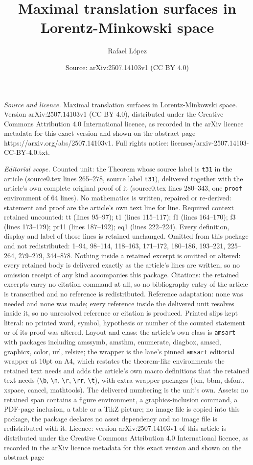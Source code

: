\documentclass[10pt,a4paper]{amsart}
\title[Maximal translation surfaces in Lorentz-Minkowski space]{Maximal translation surfaces in Lorentz-Minkowski space}
\author{Rafael L\'opez}
\date{Source: arXiv:2507.14103v1 (CC BY 4.0)}
\begin{document}
\maketitle

\noindent\emph{Source and licence.} Maximal translation surfaces in Lorentz-Minkowski space. Version arXiv:2507.14103v1 (CC BY 4.0), distributed under the Creative Commons Attribution 4.0 International licence, as recorded in the arXiv licence metadata for this exact version and shown on the abstract page https://arxiv.org/abs/2507.14103v1. Full rights notice: licenses/arxiv-2507.14103-CC-BY-4.0.txt.\par\smallskip

\noindent\textit{Editorial scope.} Counted unit: the Theorem whose source label is \texttt{t31} in the article (source0.tex lines 265--278, source label \texttt{t31}), delivered together with the article's own complete original proof of it (source0.tex lines 280--343, one \texttt{proof} environment of 64 lines). No mathematics is written, repaired or re-derived: statement and proof are the article's own text line for line. Required context retained uncounted: tt (lines 95--97); t1 (lines 115--117); f1 (lines 164--170); f3 (lines 173--179); pr11 (lines 187--192); eq1 (lines 222--224). Every definition, display and label of those lines is retained unchanged. Omitted from this package and not redistributed: 1--94, 98--114, 118--163, 171--172, 180--186, 193--221, 225--264, 279--279, 344--878. Nothing inside a retained excerpt is omitted or altered: every retained body is delivered exactly as the article's lines are written, so no omission receipt of any kind accompanies this package. Citations: the retained excerpts carry no citation command at all, so no bibliography entry of the article is transcribed and no reference is redistributed. Reference adaptation: none was needed and none was made; every reference inside the delivered unit resolves inside it, so no unresolved reference or citation is produced. Printed slips kept literal: no printed word, symbol, hypothesis or number of the counted statement or of its proof was altered. Layout and class: the article's own class is \texttt{amsart} with packages including amssymb, amsthm, enumerate, diagbox, amscd, graphicx, color, url, relsize; the wrapper is the lane's pinned \texttt{amsart} editorial wrapper at 10pt on A4, which restates the theorem-like environments the retained text needs and adds the article's own macro definitions that the retained text needs (\texttt{\textbackslash b}, \texttt{\textbackslash n}, \texttt{\textbackslash r}, \texttt{\textbackslash rr}, \texttt{\textbackslash t}), with extra wrapper packages (bm, bbm, dsfont, xspace, cancel, mathtools). The delivered numbering is the unit's own. Assets: no retained span contains a figure environment, a graphics-inclusion command, a PDF-page inclusion, a table or a TikZ picture; no image file is copied into this package, the package declares no asset dependency and no image file is redistributed with it. Licence: version arXiv:2507.14103v1 of this article is distributed under the Creative Commons Attribution 4.0 International licence, as recorded in the arXiv licence metadata for this exact version and shown on the abstract page 
\end{document}
